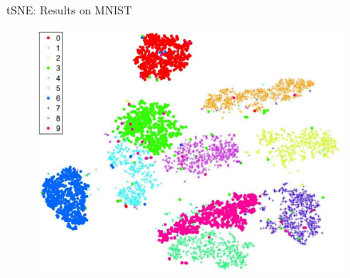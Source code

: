\begin{frame}[allowframebreaks]{tSNE: Results on MNIST}
    \begin{figure}
        \centering
        \includegraphics[width=0.9\textwidth,keepaspectratio]{images/dul/dim-reduce/slide_35_1_img.jpg}
    \end{figure}
\end{frame}

